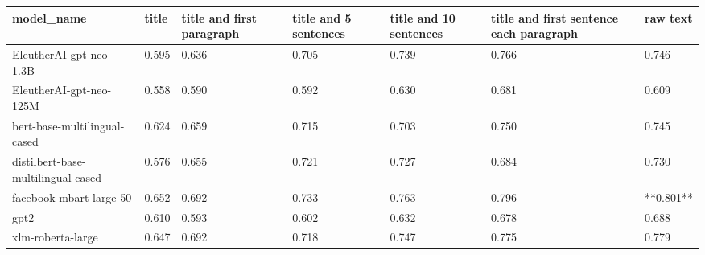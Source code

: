 \begin{tabular}{lllllll}
\toprule
                        model\_name & title & title and first paragraph & title and 5 sentences & title and 10 sentences & title and first sentence each paragraph &  raw text \\
\midrule
           EleutherAI-gpt-neo-1.3B & 0.595 &                     0.636 &                 0.705 &                  0.739 &                                   0.766 &     0.746 \\
           EleutherAI-gpt-neo-125M & 0.558 &                     0.590 &                 0.592 &                  0.630 &                                   0.681 &     0.609 \\
      bert-base-multilingual-cased & 0.624 &                     0.659 &                 0.715 &                  0.703 &                                   0.750 &     0.745 \\
distilbert-base-multilingual-cased & 0.576 &                     0.655 &                 0.721 &                  0.727 &                                   0.684 &     0.730 \\
           facebook-mbart-large-50 & 0.652 &                     0.692 &                 0.733 &                  0.763 &                                   0.796 & **0.801** \\
                              gpt2 & 0.610 &                     0.593 &                 0.602 &                  0.632 &                                   0.678 &     0.688 \\
                 xlm-roberta-large & 0.647 &                     0.692 &                 0.718 &                  0.747 &                                   0.775 &     0.779 \\
\bottomrule
\end{tabular}
